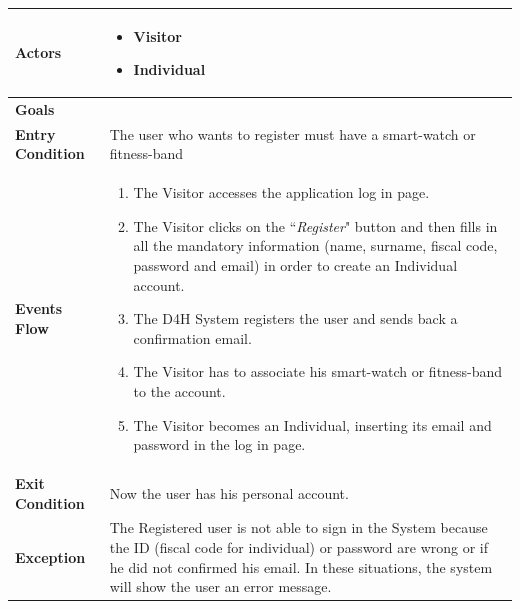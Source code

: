 \begin{table}[H]
                \begin{tabular}{|p{3cm}|p{8.2cm}|}
                    \hline
                    \textbf{Actors} & \begin{itemize}
                                          \item Visitor
                                          \item Individual
                                      \end{itemize}\\
                    \hline
                    \textbf{Goals} & \\ 
                     \hline
                    \textbf{Entry Condition} & The user who wants to register must have a smart-watch or fitness-band\\
                     \hline
                    \textbf{Events Flow} & \begin{enumerate}
                                                \item The Visitor accesses the application log in page.
                                                \item The Visitor clicks on the ``\emph{Register}" button and then fills in all the mandatory information (name, surname, fiscal code, password and email) in order to create an Individual account.
                                                \item The D4H System registers the user and sends back a confirmation email.
                                                \item The Visitor has to associate his smart-watch or fitness-band to the account.
                                                \item The Visitor becomes an Individual, inserting its email and password in the log in page.
                                            \end{enumerate}\\
                     \hline
                    \textbf{Exit Condition} & Now the user has his personal account.\\
                     \hline
                    \textbf{Exception} & The Registered user is not able to sign in the System because the ID (fiscal code for individual) or password are wrong or if he did not confirmed his email. In these situations, the system will show the user an error message.\\
                     \hline
                \end{tabular}  
            \end{table}
            
